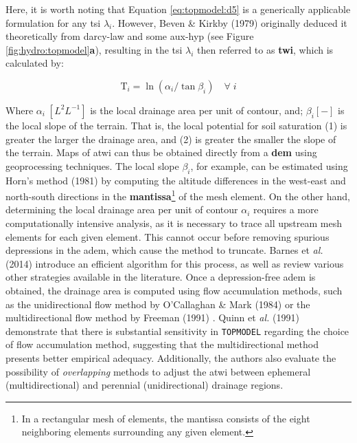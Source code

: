 \documentclass[./main_en.tex]{subfiles}
\begin{document}
\par Here, it is worth noting that Equation \eqref{eq:topmodel:d5} is a generically applicable formulation for any \gls{tsi} $\lambda_{i}$. However, Beven \& Kirkby (1979) originally deduced it theoretically from \gls{darcy-law} and some \gls{aux-hyp} (see Figure \ref{fig:hydro:topmodel}\textbf{a}), resulting in the \gls{tsi} $\lambda_{i}$ then referred to as \textbf{\gls{twi}}, which is calculated by:
\begin{linenomath*}
\begin{equation}
\label{eq:topmodel:twi}
\text{T}_{i}  = \ln{(\alpha_{i}/\tan \beta_{i})} \quad \forall \; i
\end{equation}
\end{linenomath*}
Where $\alpha_{i}\; [L^{2}L^{-1}]$ is the local drainage area per unit of contour, and; $\beta_{i} [-]$ is the local slope of the terrain. That is, the local potential for soil saturation (1) is greater the larger the drainage area, and (2) is greater the smaller the slope of the terrain. Maps of \acrshort{atwi} can thus be obtained directly from a \textbf{\gls{dem}} using geoprocessing techniques. The local slope $\beta_{i}$, for example, can be estimated using Horn's method (1981) \cite{Horn1981a} by computing the altitude differences in the west-east and north-south directions in the \textbf{mantissa}\footnote{In a rectangular mesh of elements, the mantissa consists of the eight neighboring elements surrounding any given element.} of the mesh element. On the other hand, determining the local drainage area per unit of contour $\alpha_{i}$ requires a more computationally intensive analysis, as it is necessary to trace all upstream mesh elements for each given element. This cannot occur before removing spurious depressions in the \acrshort{adem}, which cause the method to truncate. Barnes et \textit{al.} (2014) \cite{Barnes2014a} introduce an efficient algorithm for this process, as well as review various other strategies available in the literature. Once a depression-free \acrshort{adem} is obtained, the drainage area is computed using flow accumulation methods, such as the unidirectional flow method by O'Callaghan \& Mark (1984) \cite{Ocallaghan1984a} or the multidirectional flow method by Freeman (1991) \cite{Freeman1991a}. Quinn et \textit{al.} (1991) \cite{Quinn1991b} demonstrate that there is substantial sensitivity in \texttt{TOPMODEL} regarding the choice of flow accumulation method, suggesting that the multidirectional method presents better empirical adequacy. Additionally, the authors also evaluate the possibility of \textit{overlapping} methods to adjust the \acrshort{atwi} between ephemeral (multidirectional) and perennial (unidirectional) drainage regions.
\end{document}
